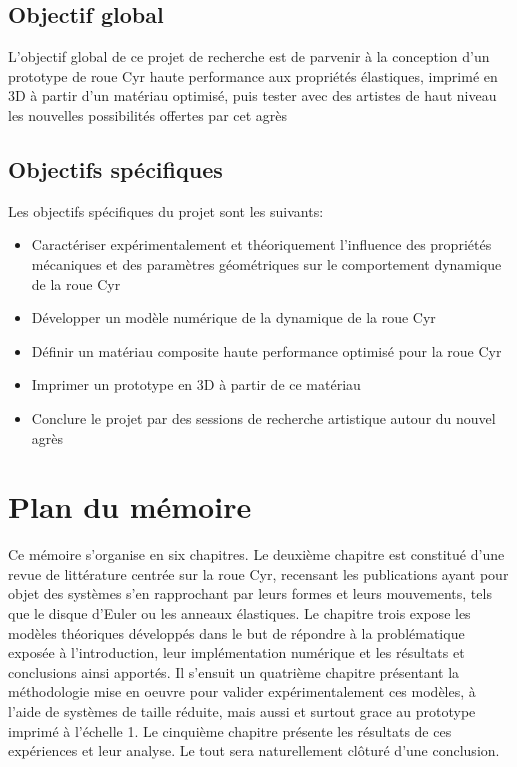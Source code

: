 \subsection{Objectif global}
L'objectif global de ce projet de recherche est de parvenir à la conception d’un prototype de roue Cyr haute performance aux propriétés élastiques, imprimé en 3D à partir d’un matériau optimisé, puis tester avec des artistes de haut niveau les nouvelles possibilités offertes par cet agrès

\subsection{Objectifs spécifiques}
Les objectifs spécifiques du projet sont les suivants:
\begin{itemize}
    \item Caractériser expérimentalement et théoriquement l’influence des propriétés mécaniques et des paramètres géométriques sur le comportement dynamique de la roue Cyr
    \item Développer un modèle numérique de la dynamique de la roue Cyr
    \item Définir un matériau composite haute performance optimisé pour la roue Cyr
    \item Imprimer un prototype en 3D à partir de ce matériau
    \item Conclure le projet par des sessions de recherche artistique autour du nouvel agrès
\end{itemize}


\section{Plan du mémoire}  %
Ce mémoire s'organise en six chapitres. Le deuxième chapitre est constitué d'une revue de littérature centrée sur la roue Cyr, recensant les publications ayant pour objet des systèmes s'en rapprochant par leurs formes et leurs mouvements, tels que le disque d'Euler ou les anneaux élastiques. Le chapitre trois expose les modèles théoriques développés dans le but de répondre à la problématique exposée à l'introduction, leur implémentation numérique et les résultats et conclusions ainsi apportés. Il s'ensuit un quatrième chapitre présentant la méthodologie mise en oeuvre pour valider expérimentalement ces modèles, à l'aide de systèmes de taille réduite, mais aussi et surtout grace au prototype imprimé à l'échelle 1. Le cinquième chapitre présente les résultats de ces expériences et leur analyse. Le tout sera naturellement clôturé d'une conclusion.